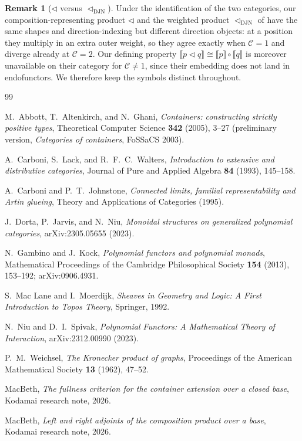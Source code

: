 \documentclass[11pt]{amsart}
\theoremstyle{plain}
\theoremstyle{definition}
\newtheorem{remark}[theorem]{Remark}
\newcommand{\C}{\mathcal{C}}
\newcommand{\ext}[1]{\llbracket #1 \rrbracket}
\newcommand{\comp}{\mathbin{\triangleleft}}
\newcommand{\compDJN}{\mathbin{\triangleleft_{\mathrm{DJN}}}}
\begin{document}
\begin{remark}[$\comp$ versus $\compDJN$]\label{rem:djn}
Under the identification of the two categories, our composition-representing product $\comp$ and the
weighted product $\compDJN$ of \cite{DJN} have the same shapes and direction-indexing but different
direction objects: at a position they multiply in an extra outer weight, so they agree exactly when
$\C=1$ and diverge already at $\C=2$. Our defining property $\ext{p\comp q}\cong\ext p\circ\ext q$ is
moreover unavailable on their category for $\C\neq1$, since their embedding does not land in
endofunctors. We therefore keep the symbols distinct throughout.
\end{remark}

\begin{thebibliography}{99}

M.~Abbott, T.~Altenkirch, and N.~Ghani,
\emph{Containers: constructing strictly positive types},
Theoretical Computer Science \textbf{342} (2005), 3--27
(preliminary version, \emph{Categories of containers}, FoSSaCS 2003).

A.~Carboni, S.~Lack, and R.~F.~C.~Walters,
\emph{Introduction to extensive and distributive categories},
Journal of Pure and Applied Algebra \textbf{84} (1993), 145--158.

A.~Carboni and P.~T.~Johnstone,
\emph{Connected limits, familial representability and Artin glueing},
Theory and Applications of Categories (1995).

J.~Dorta, P.~Jarvis, and N.~Niu,
\emph{Monoidal structures on generalized polynomial categories},
arXiv:2305.05655 (2023).

N.~Gambino and J.~Kock,
\emph{Polynomial functors and polynomial monads},
Mathematical Proceedings of the Cambridge Philosophical Society \textbf{154} (2013), 153--192;
arXiv:0906.4931.

S.~Mac Lane and I.~Moerdijk,
\emph{Sheaves in Geometry and Logic: A First Introduction to Topos Theory},
Springer, 1992.

N.~Niu and D.~I.~Spivak,
\emph{Polynomial Functors: A Mathematical Theory of Interaction},
arXiv:2312.00990 (2023).

P.~M.~Weichsel,
\emph{The Kronecker product of graphs},
Proceedings of the American Mathematical Society \textbf{13} (1962), 47--52.

MacBeth,
\emph{The fullness criterion for the container extension over a closed base},
Kodamai research note, 2026.

MacBeth,
\emph{Left and right adjoints of the composition product over a base},
Kodamai research note, 2026.

\end{thebibliography}
\end{document}
